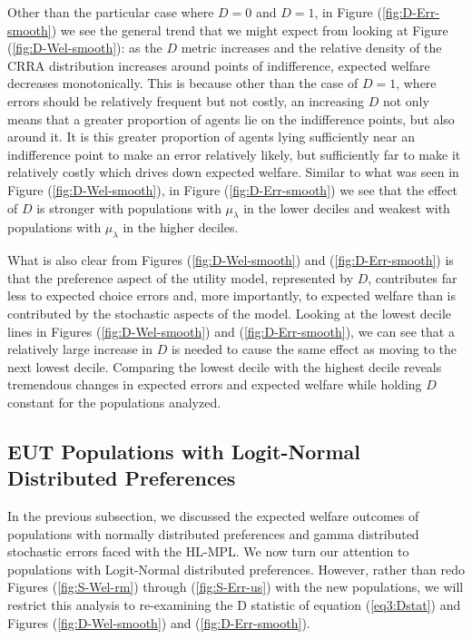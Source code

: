 \documentclass[../main.tex]{subfiles}
\begin{document}
\addtocounter{footnote}{-1}

Other than the particular case where $D=0$ and $D=1$, in Figure (\ref{fig:D-Err-smooth}) we see the general trend that we might expect from looking at Figure (\ref{fig:D-Wel-smooth}): as the $D$ metric increases and the relative density of the CRRA distribution increases around points of indifference, expected welfare decreases monotonically.
This is because other than the case of $D=1$, where errors should be relatively frequent but not costly, an increasing $D$ not only means that a greater proportion of agents lie on the indifference points, but also around it.
It is this greater proportion of agents lying sufficiently near an indifference point to make an error relatively likely, but sufficiently far to make it relatively costly which drives down expected welfare.
Similar to what was seen in Figure (\ref{fig:D-Wel-smooth}), in Figure (\ref{fig:D-Err-smooth}) we see that the effect of $D$ is stronger with populations with $\mu_\lambda$ in the lower deciles and weakest with populations with $\mu_\lambda$ in the higher deciles.

What is also clear from Figures (\ref{fig:D-Wel-smooth}) and (\ref{fig:D-Err-smooth}) is that the preference aspect of the utility model, represented by $D$, contributes far less to expected choice errors and, more importantly, to expected welfare than is contributed by the stochastic aspects of the model.
Looking at the lowest decile lines in Figures (\ref{fig:D-Wel-smooth}) and (\ref{fig:D-Err-smooth}), we can see that a relatively large increase in $D$ is needed to cause the same effect as moving to the next lowest decile.
Comparing the lowest decile with the highest decile reveals tremendous changes in expected errors and expected welfare while holding $D$ constant for the populations analyzed.

\subsection{EUT Populations with Logit-Normal Distributed Preferences}

In the previous subsection, we discussed the expected welfare outcomes of populations with normally distributed preferences and gamma distributed stochastic errors faced with the HL-MPL.
We now turn our attention to populations with Logit-Normal distributed preferences.
However, rather than redo Figures (\ref{fig:S-Wel-rm}) through (\ref{fig:S-Err-us}) with the new populations, we will restrict this analysis to re-examining the D statistic of equation (\ref{eq3:Dstat}) and Figures (\ref{fig:D-Wel-smooth}) and (\ref{fig:D-Err-smooth}).
\end{document}
